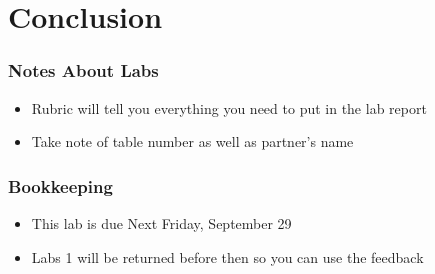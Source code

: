 \documentclass[aspectratio=169]{beamer}
\begin{document}
\section{Conclusion}
\begin{frame}
  \frametitle{Notes About Labs}
  \begin{itemize}
  \item Rubric will tell you everything you need to put in the lab report
  \item Take note of table number as well as partner's name
  \end{itemize}
\end{frame}
\begin{frame}
  \frametitle{Bookkeeping}
  \begin{itemize}
  \item This lab is due Next Friday, September 29
  \item Labs 1 will be returned before then so you can use the feedback
  \end{itemize}
\end{frame}
\end{document}
